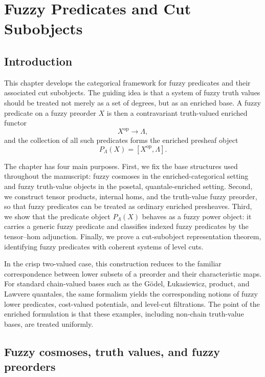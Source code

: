 \chapter{Fuzzy Predicates and Cut Subobjects}
\label{ch:fuzzy-predicates-and-cut-subobjects}

\section{Introduction}
\label{sec:introduction-fuzzy-predicates-and-cut-subobjects}

This chapter develops the categorical framework for fuzzy predicates and their associated cut subobjects. The guiding idea is that a system of fuzzy truth values should be treated not merely as a set of degrees, but as an enriched base. A fuzzy predicate on a fuzzy preorder \(X\) is then a contravariant truth-valued enriched functor
\[
    X^{\mathrm{op}}\longrightarrow \Lambda,
\]
and the collection of all such predicates forms the enriched presheaf object
\[
    P_\Lambda(X)=[X^{\mathrm{op}},\Lambda].
\]

The chapter has four main purposes. First, we fix the base structures used throughout the manuscript: fuzzy cosmoses in the enriched-categorical setting and fuzzy truth-value objects in the posetal, quantale-enriched setting. Second, we construct tensor products, internal homs, and the truth-value fuzzy preorder, so that fuzzy predicates can be treated as ordinary enriched presheaves. Third, we show that the predicate object \(P_\Lambda(X)\) behaves as a fuzzy power object: it carries a generic fuzzy predicate and classifies indexed fuzzy predicates by the tensor--hom adjunction. Finally, we prove a cut-subobject representation theorem, identifying fuzzy predicates with coherent systems of level cuts.

In the crisp two-valued case, this construction reduces to the familiar correspondence between lower subsets of a preorder and their characteristic maps. For standard chain-valued bases such as the G\"odel, {\L}ukasiewicz, product, and Lawvere quantales, the same formalism yields the corresponding notions of fuzzy lower predicates, cost-valued potentials, and level-cut filtrations. The point of the enriched formulation is that these examples, including non-chain truth-value bases, are treated uniformly.

\section{Fuzzy cosmoses, truth values, and fuzzy preorders}
\label{sec:truth-values-and-fuzzy-preorders}

